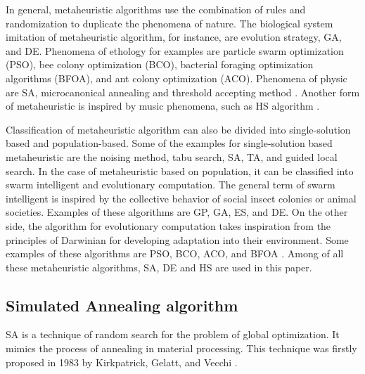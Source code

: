 \documentclass[10pt,letterpaper]{article}
\begin{document}
In general, metaheuristic algorithms use the combination of rules and randomization to duplicate the phenomena of nature. The biological system imitation of metaheuristic algorithm, for instance, are evolution strategy, GA, and DE. Phenomena of ethology for examples are particle swarm optimization (PSO), bee colony optimization (BCO), bacterial foraging optimization algorithms (BFOA), and ant colony optimization (ACO). Phenomena of physic are SA, microcanonical annealing and threshold accepting method \cite{Boussaid}. Another form of metaheuristic is inspired by music phenomena, such as HS algorithm \cite{Lee}. 

Classification of metaheuristic algorithm can also be divided into single-solution based and population-based. Some of the examples for single-solution based metaheuristic are the noising method, tabu search, SA, TA, and guided local search. In the case of metaheuristic based on population, it can be classified into swarm intelligent and evolutionary computation. The general term of swarm intelligent is inspired by the collective behavior of social insect colonies or animal societies. Examples of these algorithms are GP, GA, ES, and DE. On the other side, the algorithm for evolutionary computation takes inspiration from the principles of Darwinian for developing adaptation into their environment. Some examples of these algorithms are PSO, BCO, ACO, and BFOA \cite{Boussaid}. Among of all these metaheuristic algorithms, SA, DE and HS are used in this paper. 

\subsection{Simulated Annealing algorithm}
SA is a technique of random search for the problem of global optimization. It mimics the process of annealing in material processing\cite{Yang}. This technique was firstly proposed in 1983 by Kirkpatrick, Gelatt, and Vecchi \cite{Kirkpatrick}.
\end{document}
